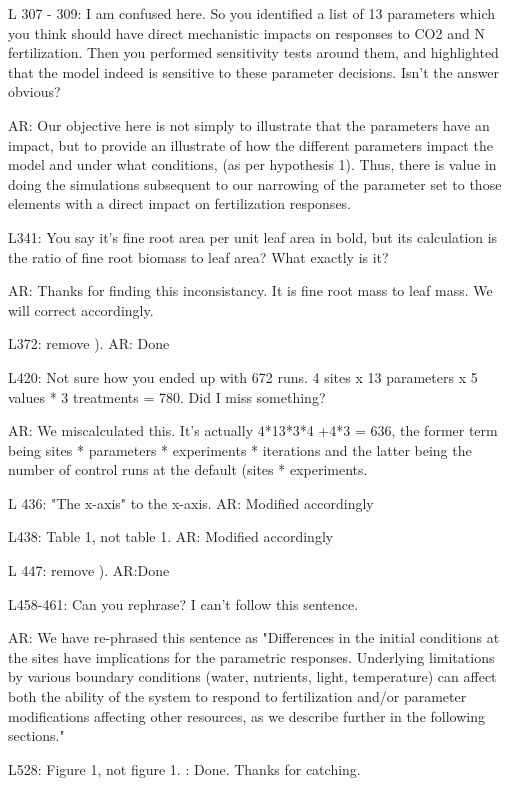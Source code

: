 \documentclass{article}
\begin{document}
L 307 - 309: I am confused here. So you identified a list of 13 parameters which you think should have direct mechanistic impacts on responses to CO2 and N fertilization. Then you performed sensitivity tests around them, and highlighted that the model indeed is sensitive to these parameter decisions. Isn't the answer obvious? 

\textsf{AR: Our objective here is not simply to illustrate that the parameters have an impact, but to provide an illustrate of how the different parameters impact the model and under what conditions, (as per hypothesis 1).  Thus, there is value in doing the simulations subsequent to our narrowing of the parameter set to those elements with a direct impact on fertilization responses. }

L341: You say it's fine root area per unit leaf area in bold, but its calculation is the ratio of fine root biomass to leaf area? What exactly is it?

\textsf{AR: Thanks for finding this inconsistancy. It is fine root mass to leaf mass. We will correct accordingly}. 

L372: remove ). 
\textsf{AR: Done}

L420: Not sure how you ended up with 672 runs. 4 sites x 13 parameters x 5 values * 3 treatments = 780. Did I miss something? 

\textsf{AR: We miscalculated this. It's actually 4*13*3*4 +4*3 = 636, the former term being sites * parameters * experiments * iterations and the latter being the number of control runs at the default (sites * experiments.}

L 436: "The x-axis" to the x-axis. 
\textsf{AR: Modified accordingly}

L438: Table 1, not table 1. 
\textsf{AR: Modified accordingly}

L 447: remove ). 
\textsf{AR:Done}

L458-461: Can you rephrase? I can't follow this sentence. 

\textsf{AR: We have re-phrased this sentence as "Differences in the initial conditions at the sites have implications for the parametric responses. Underlying limitations by various boundary conditions (water, nutrients, light, temperature) can affect both the ability of the system to respond to fertilization and/or parameter modifications affecting other resources, as we describe further in the following sections."}

L528: Figure 1, not figure 1. 
\textsf{: Done. Thanks for catching. }
\end{document}
